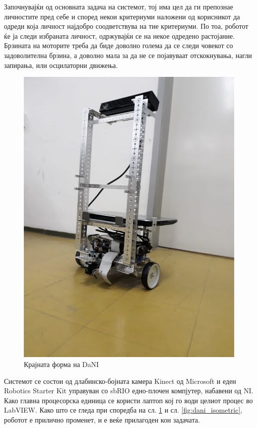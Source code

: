\documentclass[11pt]{article}
\begin{document}
    Започнувајќи од основната задача на системот, тој има цел да ги препознае личностите пред себе и според некои критериуми наложени од корисникот да одреди која личност најдобро соодветствува на тие критериуми. По тоа, роботот ќе ја следи избраната личност, одржувајќи се на некое одредено растојание. Брзината на моторите треба да биде доволно голема да се следи човекот со задоволителна брзина, а доволно мала за да не се појавуваат отскокнувања, нагли запирања, или осцилаторни движења.
    \begin{figure}[H]
      \centering
      \label{fig:final_form}
      \includegraphics[width = 0.6\linewidth]{./images/final_form.jpeg}
      \caption{Крајната форма на DaNI}
    \end{figure}
    Системот се состои од длабинско-бојната камера Kinect од Microsoft и еден Robotics Starter Kit управуван со sbRIO едно-плочен компјутер, набавени од NI. Како главна процесорска единица се користи лаптоп кој го води целиот процес во LabVIEW. Како што се гледа при споредба на сл. \ref{fig:final_form} и сл. \ref{fig:dani_isometric}, роботот е прилично променет, и е веќе прилагоден кон задачата.
\end{document}
